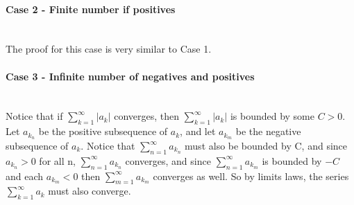 \documentclass[11pt]{article}
\begin{document}
\paragraph{Case 2 - Finite number if positives} ~\\

The proof for this case is very similar to Case 1.

\paragraph{Case 3 - Infinite number of negatives and positives} ~\\

Notice that if $\sum\limits_{k=1}^{\infty}|a_k|$ converges, then $\sum\limits_{k=1}^{\infty}|a_k|$ is bounded by some $C>0$. Let $a_{k_n}$ be the positive subsequence of $a_k$, and let $a_{k_m}$ be the negative subsequence of $a_k$. Notice that $\sum\limits_{n=1}^{\infty}a_{k_n}$ must also be bounded by C, and since $a_{k_n}>0$ for all n, $\sum\limits_{n=1}^{\infty}a_{k_n}$ converges, and since $\sum\limits_{n=1}^{\infty}a_{k_m}$ is bounded by $-C$ and each $a_{k_m}<0$ then $\sum\limits_{m=1}^{\infty}a_{k_m}$ converges as well. So by limits laws, the series $\sum\limits_{k=1}^{\infty}a_k$ must also converge. 
	
\end{document}
